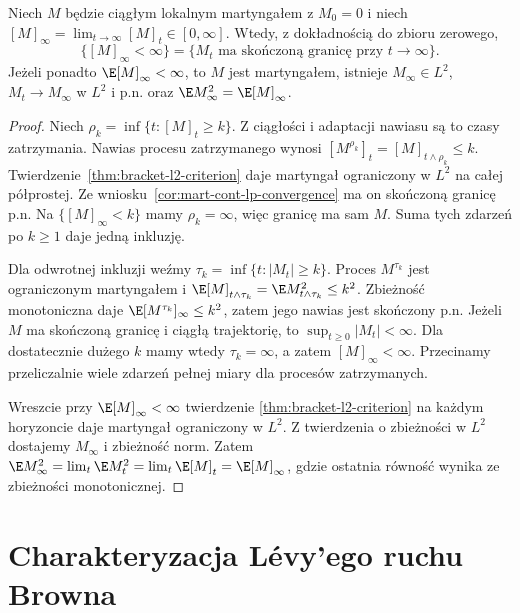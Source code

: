 \begin{twierdzenie}
\label{thm:bracket-finite-convergence}
Niech $M$ będzie ciągłym lokalnym martyngałem
z $M_0=0$ i niech
$[M]_\infty=\lim_{t\to\infty}[M]_t\in[0,\infty]$.
Wtedy, z dokładnością do zbioru zerowego,
\[
\{[M]_\infty<\infty\}
=\{M_t\text{ ma skończoną granicę przy }t\to\infty\}.
\]
Jeżeli ponadto $\E[M]_\infty<\infty$, to
$M$ jest martyngałem, istnieje $M_\infty\in L^2$,
$M_t\to M_\infty$ w $L^2$ i p.n. oraz
$\E M_\infty^2=\E[M]_\infty$.
\end{twierdzenie}
\begin{proof}
Niech $\rho_k=\inf\{t:[M]_t\ge k\}$.
Z ciągłości i adaptacji nawiasu są to czasy zatrzymania.
Nawias procesu zatrzymanego wynosi
$[M^{\rho_k}]_t=[M]_{t\wedge\rho_k}\le k$.
Twierdzenie~\ref{thm:bracket-l2-criterion}
daje martyngał ograniczony w $L^2$ na całej półprostej.
Ze wniosku~\ref{cor:mart-cont-lp-convergence}
ma on skończoną granicę p.n.
Na $\{[M]_\infty<k\}$ mamy $\rho_k=\infty$,
więc granicę ma sam $M$. Suma tych zdarzeń
po $k\ge1$ daje jedną inkluzję.

Dla odwrotnej inkluzji weźmy
$\tau_k=\inf\{t:|M_t|\ge k\}$.
Proces $M^{\tau_k}$ jest ograniczonym martyngałem
i $\E[M]_{t\wedge\tau_k}
=\E M_{t\wedge\tau_k}^2\le k^2$.
Zbieżność monotoniczna daje
$\E[M^{\tau_k}]_\infty\le k^2$, zatem jego
nawias jest skończony p.n.
Jeżeli $M$ ma skończoną granicę i ciągłą
trajektorię, to $\sup_{t\ge0}|M_t|<\infty$.
Dla dostatecznie dużego $k$ mamy wtedy
$\tau_k=\infty$, a zatem $[M]_\infty<\infty$.
Przecinamy przeliczalnie wiele zdarzeń pełnej
miary dla procesów zatrzymanych.

Wreszcie przy $\E[M]_\infty<\infty$ twierdzenie
\ref{thm:bracket-l2-criterion} na każdym horyzoncie
daje martyngał ograniczony w $L^2$.
Z twierdzenia o zbieżności w $L^2$ dostajemy
$M_\infty$ i zbieżność norm. Zatem
$\E M_\infty^2=\lim_t\E M_t^2
=\lim_t\E[M]_t=\E[M]_\infty$,
gdzie ostatnia równość wynika ze zbieżności
monotonicznej.
\end{proof}

\section{Charakteryzacja Lévy'ego ruchu Browna}

